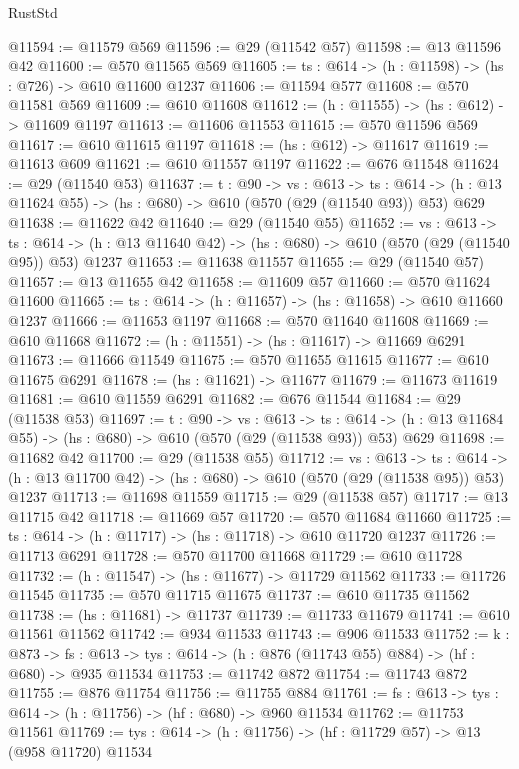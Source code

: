 \begin{lexlean}{RustStd}
\begin{coremodule}
@11594 := @11579 @569
@11596 := @29 (@11542 @57)
@11598 := @13 @11596 @42
@11600 := @570 @11565 @569
@11605 := {ts : @614} -> (h : @11598) -> (hs : @726) -> @610 @11600 @1237
@11606 := @11594 @577
@11608 := @570 @11581 @569
@11609 := @610 @11608
@11612 := (h : @11555) -> (hs : @612) -> @11609 @1197
@11613 := @11606 @11553
@11615 := @570 @11596 @569
@11617 := @610 @11615 @1197
@11618 := (hs : @612) -> @11617
@11619 := @11613 @609
@11621 := @610 @11557 @1197
@11622 := @676 @11548
@11624 := @29 (@11540 @53)
@11637 := {t : @90} ->
  {vs : @613} ->
  {ts : @614} -> (h : @13 @11624 @55) -> (hs : @680) -> @610 (@570 (@29 (@11540 @93)) @53) @629
@11638 := @11622 @42
@11640 := @29 (@11540 @55)
@11652 := {vs : @613} ->
  {ts : @614} -> (h : @13 @11640 @42) -> (hs : @680) -> @610 (@570 (@29 (@11540 @95)) @53) @1237
@11653 := @11638 @11557
@11655 := @29 (@11540 @57)
@11657 := @13 @11655 @42
@11658 := @11609 @57
@11660 := @570 @11624 @11600
@11665 := {ts : @614} -> (h : @11657) -> (hs : @11658) -> @610 @11660 @1237
@11666 := @11653 @1197
@11668 := @570 @11640 @11608
@11669 := @610 @11668
@11672 := (h : @11551) -> (hs : @11617) -> @11669 @6291
@11673 := @11666 @11549
@11675 := @570 @11655 @11615
@11677 := @610 @11675 @6291
@11678 := (hs : @11621) -> @11677
@11679 := @11673 @11619
@11681 := @610 @11559 @6291
@11682 := @676 @11544
@11684 := @29 (@11538 @53)
@11697 := {t : @90} ->
  {vs : @613} ->
  {ts : @614} -> (h : @13 @11684 @55) -> (hs : @680) -> @610 (@570 (@29 (@11538 @93)) @53) @629
@11698 := @11682 @42
@11700 := @29 (@11538 @55)
@11712 := {vs : @613} ->
  {ts : @614} -> (h : @13 @11700 @42) -> (hs : @680) -> @610 (@570 (@29 (@11538 @95)) @53) @1237
@11713 := @11698 @11559
@11715 := @29 (@11538 @57)
@11717 := @13 @11715 @42
@11718 := @11669 @57
@11720 := @570 @11684 @11660
@11725 := {ts : @614} -> (h : @11717) -> (hs : @11718) -> @610 @11720 @1237
@11726 := @11713 @6291
@11728 := @570 @11700 @11668
@11729 := @610 @11728
@11732 := (h : @11547) -> (hs : @11677) -> @11729 @11562
@11733 := @11726 @11545
@11735 := @570 @11715 @11675
@11737 := @610 @11735 @11562
@11738 := (hs : @11681) -> @11737
@11739 := @11733 @11679
@11741 := @610 @11561 @11562
@11742 := @934 @11533
@11743 := @906 @11533
@11752 := {k : @873} ->
  {fs : @613} -> {tys : @614} -> (h : @876 (@11743 @55) @884) -> (hf : @680) -> @935 @11534
@11753 := @11742 @872
@11754 := @11743 @872
@11755 := @876 @11754
@11756 := @11755 @884
@11761 := {fs : @613} -> {tys : @614} -> (h : @11756) -> (hf : @680) -> @960 @11534
@11762 := @11753 @11561
@11769 := {tys : @614} -> (h : @11756) -> (hf : @11729 @57) -> @13 (@958 @11720) @11534

\end{coremodule}
\end{lexlean}
